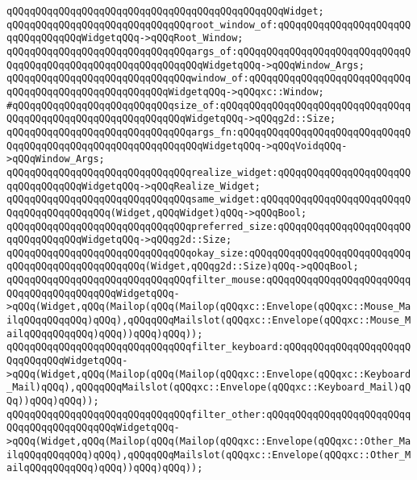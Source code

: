 \verb|qQQqqQQqqQQqqQQqqQQqqQQqqQQqqQQqqQQqqQQqqQQqqQQqWidget;|\newline
\newline
\verb|qQQqqQQqqQQqqQQqqQQqqQQqqQQqqQQqroot_window_of:qQQqqQQqqQQqqQQqqQQqqQQqqQQqqQQqqQQqWidgetqQQq->qQQqRoot_Window;|\newline
\verb|qQQqqQQqqQQqqQQqqQQqqQQqqQQqqQQqargs_of:qQQqqQQqqQQqqQQqqQQqqQQqqQQqqQQqqQQqqQQqqQQqqQQqqQQqqQQqqQQqqQQqWidgetqQQq->qQQqWindow_Args;|\newline
\verb|qQQqqQQqqQQqqQQqqQQqqQQqqQQqqQQqwindow_of:qQQqqQQqqQQqqQQqqQQqqQQqqQQqqQQqqQQqqQQqqQQqqQQqqQQqqQQqWidgetqQQq->qQQqxc::Window;|\newline
\verb|#qQQqqQQqqQQqqQQqqQQqqQQqqQQqsize_of:qQQqqQQqqQQqqQQqqQQqqQQqqQQqqQQqqQQqqQQqqQQqqQQqqQQqqQQqqQQqqQQqWidgetqQQq->qQQqg2d::Size;|\newline
\newline
\verb|qQQqqQQqqQQqqQQqqQQqqQQqqQQqqQQqargs_fn:qQQqqQQqqQQqqQQqqQQqqQQqqQQqqQQqqQQqqQQqqQQqqQQqqQQqqQQqqQQqqQQqWidgetqQQq->qQQqVoidqQQq->qQQqWindow_Args;|\newline
\verb|qQQqqQQqqQQqqQQqqQQqqQQqqQQqqQQqrealize_widget:qQQqqQQqqQQqqQQqqQQqqQQqqQQqqQQqqQQqWidgetqQQq->qQQqRealize_Widget;|\newline
\verb|qQQqqQQqqQQqqQQqqQQqqQQqqQQqqQQqsame_widget:qQQqqQQqqQQqqQQqqQQqqQQqqQQqqQQqqQQqqQQqqQQq(Widget,qQQqWidget)qQQq->qQQqBool;|\newline
\newline
\verb|qQQqqQQqqQQqqQQqqQQqqQQqqQQqqQQqpreferred_size:qQQqqQQqqQQqqQQqqQQqqQQqqQQqqQQqqQQqWidgetqQQq->qQQqg2d::Size;|\newline
\verb|qQQqqQQqqQQqqQQqqQQqqQQqqQQqqQQqokay_size:qQQqqQQqqQQqqQQqqQQqqQQqqQQqqQQqqQQqqQQqqQQqqQQqqQQq(Widget,qQQqg2d::Size)qQQq->qQQqBool;|\newline
\newline
\verb|qQQqqQQqqQQqqQQqqQQqqQQqqQQqqQQqfilter_mouse:qQQqqQQqqQQqqQQqqQQqqQQqqQQqqQQqqQQqqQQqqQQqWidgetqQQq->qQQq(Widget,qQQq(Mailop(qQQq(Mailop(qQQqxc::Envelope(qQQqxc::Mouse_MailqQQqqQQqqQQq)qQQq),qQQqqQQqMailslot(qQQqxc::Envelope(qQQqxc::Mouse_MailqQQqqQQqqQQq)qQQq))qQQq)qQQq));|\newline
\verb|qQQqqQQqqQQqqQQqqQQqqQQqqQQqqQQqfilter_keyboard:qQQqqQQqqQQqqQQqqQQqqQQqqQQqqQQqWidgetqQQq->qQQq(Widget,qQQq(Mailop(qQQq(Mailop(qQQqxc::Envelope(qQQqxc::Keyboard_Mail)qQQq),qQQqqQQqMailslot(qQQqxc::Envelope(qQQqxc::Keyboard_Mail)qQQq))qQQq)qQQq));|\newline
\verb|qQQqqQQqqQQqqQQqqQQqqQQqqQQqqQQqfilter_other:qQQqqQQqqQQqqQQqqQQqqQQqqQQqqQQqqQQqqQQqqQQqWidgetqQQq->qQQq(Widget,qQQq(Mailop(qQQq(Mailop(qQQqxc::Envelope(qQQqxc::Other_MailqQQqqQQqqQQq)qQQq),qQQqqQQqMailslot(qQQqxc::Envelope(qQQqxc::Other_MailqQQqqQQqqQQq)qQQq))qQQq)qQQq));|\newline
